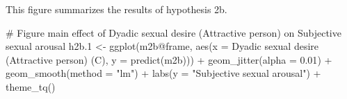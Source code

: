\documentclass[
  bookmarksnumbered]{article}
\newenvironment{Shaded}{\begin{snugshade}}{\end{snugshade}}
\newcommand{\AttributeTok}[1]{\textcolor[rgb]{0.80,0.80,0.80}{#1}}
\newcommand{\CommentTok}[1]{\textcolor[rgb]{0.50,0.62,0.50}{#1}}
\newcommand{\FloatTok}[1]{\textcolor[rgb]{0.75,0.75,0.82}{#1}}
\newcommand{\FunctionTok}[1]{\textcolor[rgb]{0.94,0.94,0.56}{#1}}
\newcommand{\NormalTok}[1]{\textcolor[rgb]{0.80,0.80,0.80}{#1}}
\newcommand{\OtherTok}[1]{\textcolor[rgb]{0.94,0.94,0.56}{#1}}
\newcommand{\SpecialCharTok}[1]{\textcolor[rgb]{0.86,0.64,0.64}{#1}}
\newcommand{\StringTok}[1]{\textcolor[rgb]{0.80,0.58,0.58}{#1}}
\begin{document}
This figure summarizes the results of hypothesis 2b.

\begin{Shaded}
\begin{Highlighting}[]
\CommentTok{\# Figure main effect of Dyadic sexual desire (Attractive person) on Subjective sexual arousal}
\NormalTok{h2b}\FloatTok{.1} \OtherTok{\textless{}{-}} \FunctionTok{ggplot}\NormalTok{(m2b}\SpecialCharTok{@}\NormalTok{frame, }\FunctionTok{aes}\NormalTok{(}\AttributeTok{x =} \StringTok{\textasciigrave{}}\AttributeTok{Dyadic sexual desire (Attractive person) (C)}\StringTok{\textasciigrave{}}\NormalTok{,}
                               \AttributeTok{y =} \FunctionTok{predict}\NormalTok{(m2b))) }\SpecialCharTok{+}
  \FunctionTok{geom\_jitter}\NormalTok{(}\AttributeTok{alpha =} \FloatTok{0.01}\NormalTok{) }\SpecialCharTok{+}
  \FunctionTok{geom\_smooth}\NormalTok{(}\AttributeTok{method =} \StringTok{"lm"}\NormalTok{) }\SpecialCharTok{+}
  \FunctionTok{labs}\NormalTok{(}\AttributeTok{y =} \StringTok{"Subjective sexual arousal"}\NormalTok{) }\SpecialCharTok{+}
  \FunctionTok{theme\_tq}\NormalTok{()}


\end{Highlighting}
\end{Shaded}
\end{document}
